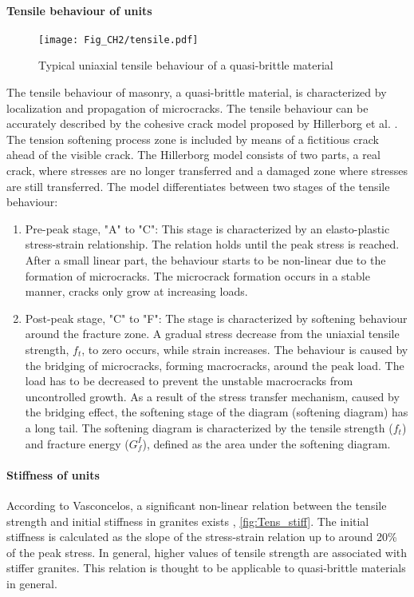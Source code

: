 \paragraph{Tensile behaviour of units}

\begin{figure}[!htb]
    \centering
    \texttt{[image: Fig\_CH2/tensile.pdf]}
    \caption{Typical uniaxial tensile behaviour of a quasi-brittle material \cite{bakeer2009collapse}}
    \label{fig:Tens}
\end{figure}

The tensile behaviour of masonry, a quasi-brittle material, is characterized by localization and propagation of microcracks. The tensile behaviour can be accurately described by the cohesive crack model proposed by Hillerborg et al. \cite{HILLERBORG1976773}. The tension softening process zone is included by means of a fictitious crack ahead of the visible crack. The Hillerborg model consists of two parts, a real crack, where stresses are no longer transferred and a damaged zone where stresses are still transferred. The model differentiates between two stages of the tensile behaviour:

\begin{enumerate}
  \item Pre-peak stage, "A" to "C": This stage is characterized by an elasto-plastic stress-strain relationship. The relation holds until the peak stress is reached. After a small linear part, the behaviour starts to be non-linear due to the formation of microcracks. The microcrack formation occurs in a stable manner, cracks only grow at increasing loads.
  \item Post-peak stage, "C" to "F": The stage is characterized by softening behaviour around the fracture zone. A gradual stress decrease from the uniaxial tensile strength, $f_{t}$, to zero occurs, while strain increases. The behaviour is caused by the bridging of microcracks, forming macrocracks, around the peak load. The load has to be decreased to prevent the unstable macrocracks from uncontrolled growth. As a result of the stress transfer mechanism, caused by the bridging effect, the softening stage of the diagram (softening diagram) has a long tail. The softening diagram is characterized by the tensile strength ($f_{t}$) and fracture energy ($G_{f}^I$), defined as the area under the softening diagram.
\end{enumerate}

\paragraph{Stiffness of units}
According to Vasconcelos, a significant non-linear relation between the tensile strength and initial stiffness in granites exists \cite{vasconcelos2005experimental}, \autoref{fig:Tens_stiff}. The initial stiffness is calculated as the slope of the stress-strain relation up to around 20\% of the peak stress. In general, higher values of tensile strength are associated with stiffer granites. This relation is thought to be applicable to quasi-brittle materials in general.

